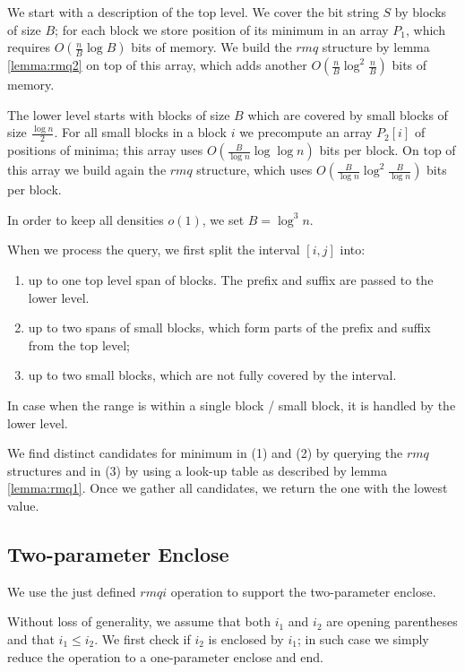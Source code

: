 We start with a description of the top level.
We cover the bit string $S$ by blocks of size $B$; for each block we store position of its minimum in an array $P_1$, which requires $O(\frac{n}{B} \log B)$ bits of memory.
We build the $rmq$ structure by lemma \ref{lemma:rmq2} on top of this array, which adds another $O(\frac{n}{B} \log^2 \frac{n}{B})$ bits of memory.

The lower level starts with blocks of size $B$ which are covered by small blocks of size $\frac{\log n}{2}$.
For all small blocks in a block $i$ we precompute an array $P_2[i]$ of positions of minima; this array uses $O(\frac{B}{\log n} \log \log n)$ bits per block.
On top of this array we build again the $rmq$ structure, which uses $O(\frac{B}{\log n} \log^2 \frac{B}{\log n})$ bits per block.

In order to keep all densities $o(1)$, we set $B = \log^3 n$.

When we process the query, we first split the interval $[i, j]$ into:
\begin{enumerate}
	\item up to one top level span of blocks.
	The prefix and suffix are passed to the lower level.
	\item up to two spans of small blocks, which form parts of the prefix and suffix from the top level;
	\item up to two small blocks, which are not fully covered by the interval.
\end{enumerate}
In case when the range is within a single block / small block, it is handled by the lower level.

We find distinct candidates for minimum in (1) and (2) by querying the $rmq$ structures and in (3) by using a look-up table as described by lemma \ref{lemma:rmq1}.
Once we gather all candidates, we return the one with the lowest value.

\subsection{\label{ss:enclose2}Two-parameter Enclose}

We use the just defined $rmqi$ operation to support the two-parameter enclose.

Without loss of generality, we assume that both $i_1$ and $i_2$ are opening parentheses and that $i_1 \le i_2$.
We first check if $i_2$ is enclosed by $i_1$; in such case we simply reduce the operation to a one-parameter enclose and end.

